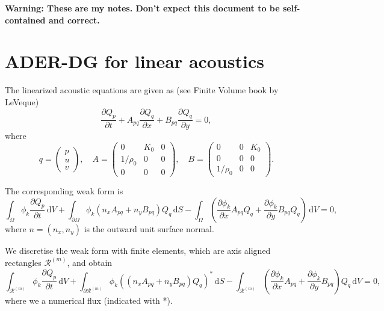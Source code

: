 \documentclass[a4paper]{scrartcl}
\newcommand{\dd}[1]{\,\mathrm{d}#1}
\begin{document}
\textbf{\Huge Warning: These are my notes. Don't expect this document to be self-contained and correct.}

\section{ADER-DG for linear acoustics}
The linearized acoustic equations are given as (see Finite Volume book by LeVeque)
\begin{equation}\label{eq:pde}
 \frac{\partial Q_p}{\partial t} + A_{pq}\frac{\partial Q_q}{\partial x} + B_{pq}\frac{\partial Q_q}{\partial y} = 0,
\end{equation}
where
\begin{equation}
 q = \begin{pmatrix}p \\ u \\ v\end{pmatrix}, \quad
 A = \begin{pmatrix}0 & K_0 & 0 \\ 1/\rho_0 & 0 & 0 \\ 0 & 0 & 0 \end{pmatrix}, \quad
 B = \begin{pmatrix}0 & 0 & K_0 \\ 0 & 0 & 0 \\ 1/\rho_0 & 0 & 0 \end{pmatrix}.
\end{equation}

The corresponding weak form is
\begin{equation}
 \int_{\Omega}\phi_k\frac{\partial Q_p}{\partial t}\dd{V} +
 \int_{\partial\Omega}\phi_k \left(n_xA_{pq} + n_yB_{pq}\right)Q_q\dd{S} -
 \int_{\Omega}\left(\frac{\partial \phi_k}{\partial x}A_{pq}Q_q + \frac{\partial \phi_k}{\partial y}B_{pq}Q_q\right)\dd{V} = 0,
\end{equation}
where $n=(n_x,n_y)$ is the outward unit surface normal.

We discretise the weak form with finite elements, which are axis aligned rectangles $\mathcal R^{(m)}$, and obtain
\begin{equation}
 \int_{\mathcal R^{(m)}}\phi_k\frac{\partial Q_p}{\partial t}\dd{V} +
 \int_{\partial\mathcal R^{(m)}}\phi_k \left(\left(n_xA_{pq} + n_yB_{pq}\right)Q_q\right)^*\dd{S} -
 \int_{\mathcal R^{(m)}}\left(\frac{\partial \phi_k}{\partial x}A_{pq} + \frac{\partial \phi_k}{\partial y}B_{pq}\right)Q_q\dd{V} = 0,
\end{equation}
where we a numerical flux (indicated with *).
\end{document}
